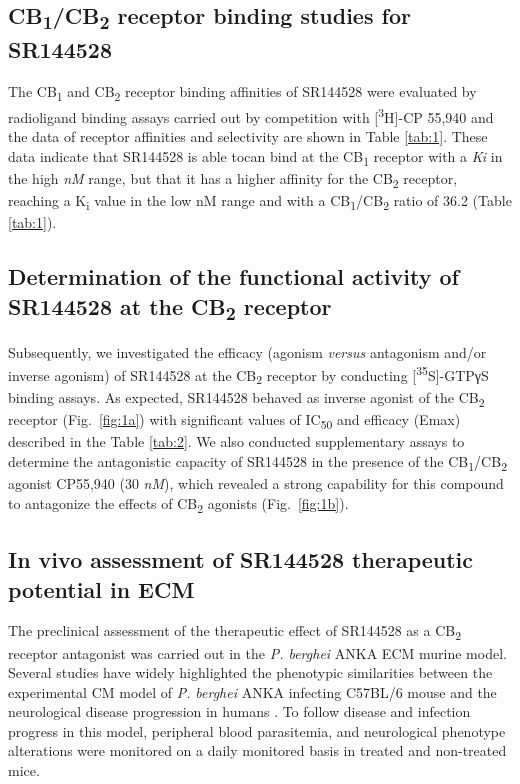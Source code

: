 \documentclass[empirical, authordate]{jote-new-article}
\begin{document}
\subsection{CB\textsubscript{1}/CB\textsubscript{2} receptor binding studies for SR144528}

The CB\textsubscript{1} and CB\textsubscript{2} receptor binding affinities of SR144528 were evaluated by radioligand binding assays carried out by competition with [\textsuperscript{3}H]-CP 55,940 and the data of receptor affinities and selectivity are shown in Table \ref{tab:1}. These data indicate that SR144528 is able tocan bind at the CB\textsubscript{1} receptor with a \emph{Ki} in the high \emph{nM} range, but that it has a higher affinity for the CB\textsubscript{2} receptor, reaching a K\textsubscript{i} value in the low nM range and with a CB\textsubscript{1}/CB\textsubscript{2} ratio of 36.2 (Table \ref{tab:1}).






\subsection{Determination of the functional activity of SR144528 at the CB\textsubscript{2} receptor}

Subsequently, we investigated the efficacy (agonism \emph{versus} antagonism and/or inverse agonism) of SR144528 at the CB\textsubscript{2 }receptor by conducting [\textsuperscript{35}S]-GTPγS binding assays. As expected, SR144528 behaved as inverse agonist of the CB\textsubscript{2} receptor (Fig.~\ref{fig:1a}) with significant values of IC\textsubscript{50} and efficacy (Emax) described in the Table \ref{tab:2}. We also conducted supplementary assays to determine the antagonistic capacity of SR144528 in the presence of the CB\textsubscript{1}/CB\textsubscript{2} agonist CP55,940 (30 \emph{nM}), which revealed a strong capability for this compound to antagonize the effects of CB\textsubscript{2} agonists (Fig.~\ref{fig:1b}).


\subsection{In vivo assessment of SR144528 therapeutic potential in ECM}




The preclinical assessment of the therapeutic effect of SR144528 as a CB\textsubscript{2} receptor antagonist was carried out in the \emph{P. berghei }ANKA ECM murine model. Several studies have widely highlighted the phenotypic similarities between the experimental CM model of \emph{P. }\emph{berghei}\emph{ }ANKA infecting C57BL/6 mouse and the neurological disease progression in humans \parencite{DeSouza2010, Hunt2003, Lou2001,Medana2006}. To follow disease and infection progress in this model, peripheral blood parasitemia, and neurological phenotype alterations were monitored on a daily monitored basis in treated and non-treated mice.
\end{document}
